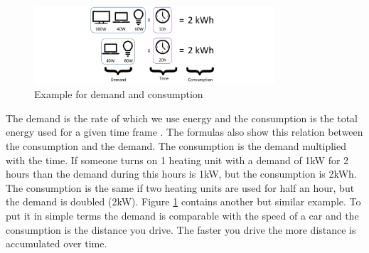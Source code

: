 \begin{figure}[!h]
	\centering
	\includegraphics[width=0.80\textwidth]{../figures/DemandConsumption.pdf}
	\caption{Example for demand and consumption}
	\label{fig:demandConsumption}
\end{figure}

The demand is the rate of which we use energy and the consumption is the total energy used for a given time frame \cite{StonyBrookUniversity}. The formulas also show this relation between the consumption and the demand. The consumption is the demand multiplied with the time. If someone turns on 1 heating unit with a demand of 1kW for 2 hours than the demand during this hours is 1kW, but the consumption is 2kWh. The consumption is the same if two heating units are used for half an hour, but the demand is doubled (2kW). Figure \ref{fig:demandConsumption} contains another but similar example. To put it in simple terms the demand is comparable with the speed of a car and the consumption is the distance you drive. The faster you drive the more distance is accumulated over time.